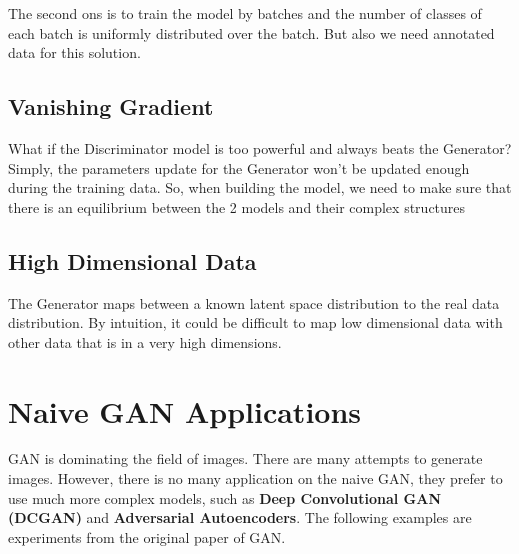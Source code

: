 \documentclass{winnower}
\begin{document}
The second ons is to train the model by batches and the number of classes of each batch is uniformly distributed over the batch. But also we need annotated data for this solution.


\subsection{Vanishing Gradient}

What if the Discriminator model is too powerful and always beats the Generator? Simply, the parameters update for the Generator won't be updated enough during the training data. So, when building the model, we need to make sure that there is an equilibrium between the 2 models and their complex structures

\subsection{High Dimensional Data}
The Generator maps between a known latent space distribution to the real data distribution. By intuition, it could be difficult to map low dimensional data with other data that is in a very high dimensions.


\section{Naive GAN Applications}
GAN is dominating the field of images. There are many attempts to generate images. However, there is no many application on the naive GAN, they prefer to use much more complex models, such as \textbf{Deep Convolutional GAN (DCGAN)} and \textbf{Adversarial Autoencoders}. The following examples are experiments from the original paper of GAN.
\end{document}
